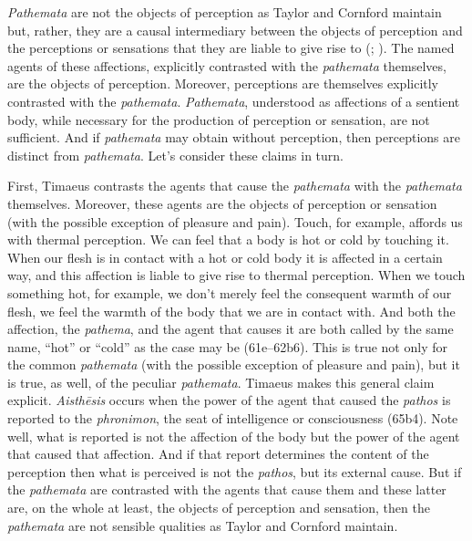 \emph{Pathemata} are not the objects of perception as Taylor and Cornford maintain but, rather, they are a causal intermediary between the objects of perception and the perceptions or sensations that they are liable to give rise to (\citealt[138]{OBrien:1984ji}; \citealt{Brisson:1997qr}). The named agents of these affections, explicitly contrasted with the \emph{pathemata} themselves, are the objects of perception. Moreover, perceptions are themselves explicitly contrasted with the \emph{pathemata}. \emph{Pathemata}, understood as affections of a sentient body, while necessary for the production of perception or sensation, are not sufficient. And if \emph{pathemata} may obtain without perception, then perceptions are distinct from \emph{pathemata}. Let's consider these claims in turn.

First, Timaeus contrasts the agents that cause the \emph{pathemata} with the \emph{pathemata} themselves. Moreover, these agents are the objects of perception or sensation (with the possible exception of pleasure and pain). Touch, for example, affords us with thermal perception. We can feel that a body is hot or cold by touching it. When our flesh is in contact with a hot or cold body it is affected in a certain way, and this affection is liable to give rise to thermal perception. When we touch something hot, for example, we don't merely feel the consequent warmth of our flesh, we feel the warmth of the body that we are in contact with. And both the affection, the \emph{pathema}, and the agent that causes it are both called by the same name, ``hot'' or ``cold'' as the case may be (61e--62b6). This is true not only for the common \emph{pathemata} (with the possible exception of pleasure and pain), but it is true, as well, of the peculiar \emph{pathemata}. Timaeus makes this general claim explicit. \emph{Aisthēsis} occurs when the power of the agent that caused the \emph{pathos} is reported to the \emph{phronimon}, the seat of intelligence or consciousness (65b4). Note well, what is reported is not the affection of the body but the power of the agent that caused that affection. And if that report determines the content of the perception then what is perceived is not the \emph{pathos}, but its external cause. But if the \emph{pathemata} are contrasted with the agents that cause them and these latter are, on the whole at least, the objects of perception and sensation, then the \emph{pathemata} are not sensible qualities as Taylor and Cornford maintain.

